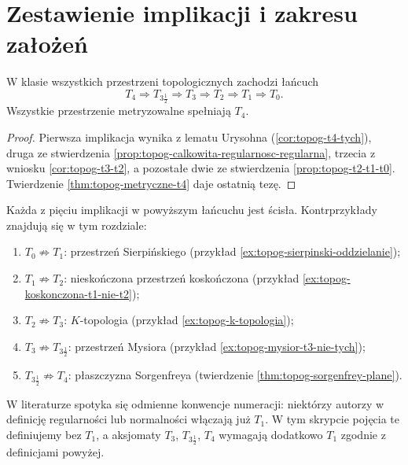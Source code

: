 \section{Zestawienie implikacji i zakresu założeń}
\label{sec:topog-oddzielanie-implikacje}

\begin{stwierdzenie}
\label{prop:topog-oddzielanie-hierarchia}
W klasie wszystkich przestrzeni topologicznych zachodzi łańcuch
\[
T_4\Longrightarrow T_{3\frac12}\Longrightarrow T_3
\Longrightarrow T_2\Longrightarrow T_1\Longrightarrow T_0.
\]
Wszystkie przestrzenie metryzowalne spełniają $T_4$.
\end{stwierdzenie}
\begin{proof}
Pierwsza implikacja wynika z lematu Urysohna
(\ref{cor:topog-t4-tych}), druga ze stwierdzenia
\ref{prop:topog-calkowita-regularnosc-regularna},
trzecia z wniosku \ref{cor:topog-t3-t2}, a pozostałe
dwie ze stwierdzenia \ref{prop:topog-t2-t1-t0}.
Twierdzenie \ref{thm:topog-metryczne-t4} daje ostatnią tezę.
\end{proof}

\begin{uwaga}
\label{rem:topog-hierarchia-ostra}
Każda z pięciu implikacji w powyższym łańcuchu jest ścisła.
Kontrprzykłady znajdują się w tym rozdziale:
\begin{enumerate}[label=(\roman*)]
\item $T_0\not\Rightarrow T_1$: przestrzeń Sierpińskiego
      (przykład \ref{ex:topog-sierpinski-oddzielanie});
\item $T_1\not\Rightarrow T_2$: nieskończona przestrzeń
      koskończona (przykład \ref{ex:topog-koskonczona-t1-nie-t2});
\item $T_2\not\Rightarrow T_3$: $K$-topologia
      (przykład \ref{ex:topog-k-topologia});
\item $T_3\not\Rightarrow T_{3\frac12}$: przestrzeń
      Mysiora (przykład \ref{ex:topog-mysior-t3-nie-tych});
\item $T_{3\frac12}\not\Rightarrow T_4$:
      płaszczyzna Sorgenfreya
      (twierdzenie \ref{thm:topog-sorgenfrey-plane}).
\end{enumerate}
W literaturze spotyka się odmienne konwencje numeracji:
niektórzy autorzy w definicję regularności lub normalności
włączają już $T_1$. W tym skrypcie pojęcia te definiujemy
bez $T_1$, a aksjomaty $T_3$, $T_{3\frac12}$, $T_4$
wymagają dodatkowo $T_1$ zgodnie z definicjami powyżej.
\end{uwaga}

